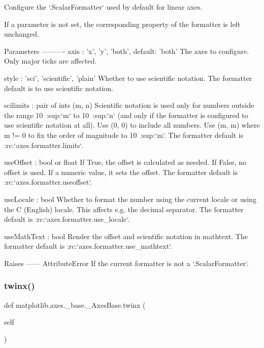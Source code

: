\begin{DoxyVerb}Configure the `.ScalarFormatter` used by default for linear axes.

If a parameter is not set, the corresponding property of the formatter
is left unchanged.

Parameters
----------
axis : {'x', 'y', 'both'}, default: 'both'
    The axes to configure.  Only major ticks are affected.

style : {'sci', 'scientific', 'plain'}
    Whether to use scientific notation.
    The formatter default is to use scientific notation.

scilimits : pair of ints (m, n)
    Scientific notation is used only for numbers outside the range
    10\ :sup:`m` to 10\ :sup:`n` (and only if the formatter is
    configured to use scientific notation at all).  Use (0, 0) to
    include all numbers.  Use (m, m) where m != 0 to fix the order of
    magnitude to 10\ :sup:`m`.
    The formatter default is :rc:`axes.formatter.limits`.

useOffset : bool or float
    If True, the offset is calculated as needed.
    If False, no offset is used.
    If a numeric value, it sets the offset.
    The formatter default is :rc:`axes.formatter.useoffset`.

useLocale : bool
    Whether to format the number using the current locale or using the
    C (English) locale.  This affects e.g. the decimal separator.  The
    formatter default is :rc:`axes.formatter.use_locale`.

useMathText : bool
    Render the offset and scientific notation in mathtext.
    The formatter default is :rc:`axes.formatter.use_mathtext`.

Raises
------
AttributeError
    If the current formatter is not a `.ScalarFormatter`.
\end{DoxyVerb}
 \mbox{\label{classmatplotlib_1_1axes_1_1__base_1_1__AxesBase_a8d195fa80fa2f02dd9d5d0108a716d48}} 
\subsubsection{\texorpdfstring{twinx()}{twinx()}}
{\footnotesize\ttfamily def matplotlib.\+axes.\+\_\+base.\+\_\+\+Axes\+Base.\+twinx (\begin{DoxyParamCaption}\item[{}]{self }\end{DoxyParamCaption})}

